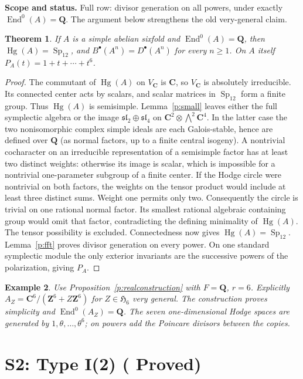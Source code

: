 \documentclass[11pt,reqno]{article}
\theoremstyle{emphasizedplain}
\DeclareRobustCommand{\provedstatus}{%
  \texorpdfstring{\textcolor{ProvedGreen}{\textbf{Proved}}}{Proved}}
\newtheorem{theorem}{Theorem}[section]
\theoremstyle{emphasizeddefinition}
\newtheorem{example}[theorem]{Example}
\theoremstyle{emphasizeddefinition}
\DeclareMathOperator{\End}{End}
\DeclareMathOperator{\Hg}{Hg}
\DeclareMathOperator{\Sp}{Sp}
\newcommand{\Q}{\mathbf Q}
\newcommand{\C}{\mathbf C}
\newcommand{\Z}{\mathbf Z}
\newcommand{\B}{B}
\newcommand{\D}{D}
\newcommand{\status}[1]{%
  \par\nobreak\smallskip\noindent
  {\setlength{\fboxsep}{7pt}%
   \colorbox{ScopeBackground}{%
    \parbox{\dimexpr\linewidth-2\fboxsep\relax}{%
     \small\textbf{\textcolor{HeadingInk}{Scope and status.}} #1}}}%
  \par\nobreak\medskip}
\begin{document}
\status{Full row: divisor generation on all powers, under exactly
$\End^0(A)=\Q$. The argument below strengthens the old very-general claim.}
\begin{theorem}\label{t:S1}
If $A$ is a simple abelian sixfold and $\End^0(A)=\Q$, then
$\Hg(A)=\Sp_{12}$, and $\B^\bullet(A^n)=\D^\bullet(A^n)$ for every $n\geq1$.
On $A$ itself $P_A(t)=1+t+\cdots+t^6$.
\end{theorem}
\begin{proof}
The commutant of $\Hg(A)$ on $V_\C$ is $\C$, so $V_\C$ is absolutely
irreducible. Its connected center acts by scalars, and scalar matrices in
$\Sp_{12}$ form a finite group. Thus $\Hg(A)$ is semisimple.
Lemma~\ref{p:small} leaves either the full symplectic algebra or the image
$\mathfrak{sl}_2\oplus\mathfrak{sl}_4$ on
$\C^2\otimes\bigwedge^2\C^4$.
In the latter case the two nonisomorphic complex simple ideals are each
Galois-stable, hence are defined over $\Q$ (as normal factors, up to a finite
central isogeny). A nontrivial cocharacter on an irreducible representation
of a semisimple factor has at least two distinct weights: otherwise its
image is scalar, which is impossible for a nontrivial one-parameter
subgroup of a finite center. If the Hodge circle were nontrivial on both
factors, the weights on the tensor product would include at least three
distinct sums. Weight one permits only two. Consequently the circle is
trivial on one rational normal factor. Its smallest rational algebraic
containing group would omit that factor, contradicting the defining
minimality of $\Hg(A)$. The tensor possibility is excluded.
Connectedness now gives $\Hg(A)=\Sp_{12}$. Lemma~\ref{p:fft} proves divisor
generation on every power. On one standard symplectic module the only
exterior invariants are the successive powers of the polarization, giving
$P_A$.
\end{proof}
\begin{example}
Use Proposition~\ref{p:realconstruction} with $F=\Q$, $r=6$.
Explicitly $A_Z=\C^6/(\Z^6+Z\Z^6)$ for $Z\in\mathfrak H_6$ very general.
The construction proves simplicity and $\End^0(A_Z)=\Q$. The seven
one-dimensional Hodge spaces are generated by $1,\theta,\ldots,\theta^6$;
on powers add the Poincare divisors between the copies.
\end{example}
\section{S2: Type I(2) (\provedstatus)}\label{sec:S2}
\end{document}

